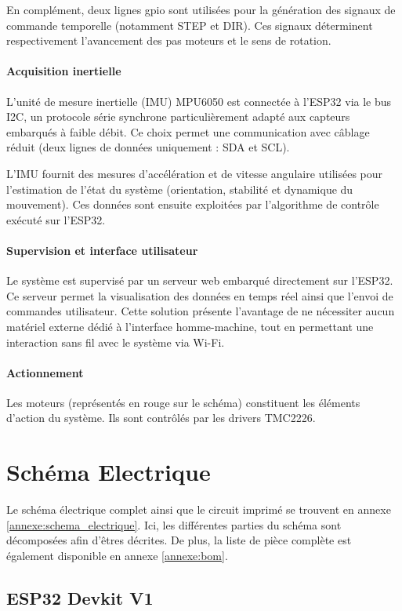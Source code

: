 En complément, deux lignes \acrshort{gpio} sont utilisées pour la génération des signaux de commande temporelle (notamment STEP et DIR). Ces signaux déterminent respectivement l'avancement des pas moteurs et le sens de rotation.

\paragraph{Acquisition inertielle}
L'unité de mesure inertielle (IMU) MPU6050 est connectée à l'ESP32 via le bus I2C, un protocole série synchrone particulièrement adapté aux capteurs embarqués à faible débit. Ce choix permet une communication avec câblage réduit (deux lignes de données uniquement : SDA et SCL).

L'IMU fournit des mesures d'accélération et de vitesse angulaire utilisées pour l'estimation de l'état du système (orientation, stabilité et dynamique du mouvement). Ces données sont ensuite exploitées par l'algorithme de contrôle exécuté sur l'ESP32.

\paragraph{Supervision et interface utilisateur}
Le système est supervisé par un serveur web embarqué directement sur l'ESP32. Ce serveur permet la visualisation des données en temps réel ainsi que l'envoi de commandes utilisateur. Cette solution présente l'avantage de ne nécessiter aucun matériel externe dédié à l'interface homme-machine, tout en permettant une interaction sans fil avec le système via Wi-Fi.

\paragraph{Actionnement}
Les moteurs (représentés en rouge sur le schéma) constituent les éléments d'action du système. Ils sont contrôlés par les drivers TMC2226.


\section{Schéma Electrique}
Le schéma électrique complet ainsi que le circuit imprimé se trouvent en annexe \ref{annexe:schema_electrique}. Ici, les différentes parties du schéma sont décomposées afin d'êtres décrites.
De plus, la liste de pièce complète est également disponible en annexe \ref{annexe:bom}.

\subsection{ESP32 Devkit V1}

